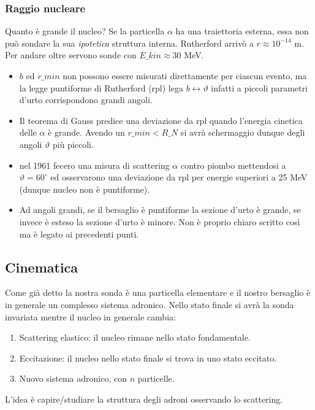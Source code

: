 \subsubsection{Raggio nucleare}    
Quanto è grande il nucleo? Se la particella $\alpha$ ha una traiettoria esterna, essa non può sondare la sua \textit{ipotetica} struttura interna. Rutherford arrivò a $r\approx10^{-14}$ m. Per andare oltre servono sonde con $E\_{kin}\approx30$ MeV.
\begin{itemize}
    \item $b$ ed $r\_{min}$ non possono essere misurati direttamente per ciascun evento, ma la legge puntiforme di Rutherford (rpl) lega $b\leftrightarrow\vartheta$ infatti a piccoli parametri d'urto corrispondono grandi angoli.
    \item Il teorema di Gauss predice una deviazione da rpl quando l'energia cinetica delle $\alpha$ è grande. Avendo un $r\_{min}<R\_N$ si avrà schermaggio dunque degli angoli $\vartheta$ più piccoli.
    \item nel 1961 fecero una misura di scattering $\alpha$ contro piombo mettendosi a $\vartheta=60^\circ$ ed osservarono una deviazione da rpl per energie superiori a 25 MeV (dunque nucleo non è puntiforme).
    \item Ad angoli grandi, se il bersaglio è puntiforme la sezione d'urto è grande, se invece è esteso la sezione d'urto è minore. Non è proprio chiaro scritto così ma è legato ai precedenti punti. 
\end{itemize}
\subsection{Cinematica}
Come già detto la nostra sonda è una particella elementare e il nostro bersaglio è in generale un complesso sistema adronico. Nello stato finale si avrà la sonda invariata mentre il nucleo in generale cambia:
\begin{enumerate}
    \item Scattering elastico: il nucleo rimane nello stato fondamentale.
    \item Eccitazione: il nucleo nello stato finale si trova in uno stato eccitato.
    \item Nuovo sistema adronico, con $n$ particelle.
\end{enumerate}
L'idea è capire/studiare la struttura degli adroni osservando lo scattering.
